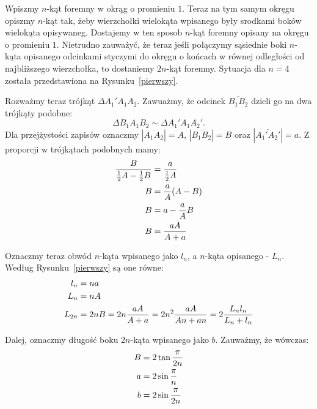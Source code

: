Wpiszmy $n$-kąt foremny w okrąg o promieniu $1$. Teraz na tym samym okręgu opiszmy $n$-kąt tak, żeby wierzchołki wielokąta wpisanego były srodkami boków wielokąta opisywaneg. Dostajemy w ten sposob $n$-kąt foremny opisany na okręgu o promieniu $1$. Nietrudno zauważyć, że teraz jeśli połączymy sąsiednie boki $n$-kąta opisanego odcinkami styczymi do okręgu o końcach w równej odległości od najbliższego wierzchołka, to dostaniemy $2n$-kąt foremny. Sytuacja dla $n=4$ została  przedstawiona na Rysunku~\ref{pierwszy}.

Rozważmy teraz trójkąt $\Delta A_1'A_1A_2$. Zawuażmy, że odcinek $\overline{B_1B_2}$ dzieli go na dwa trójkąty podobne:
$$\Delta B_1A_1B_2\sim\Delta A_1'A_1A_2'.$$
Dla przejżystości zapisów oznaczmy $|\overline{A_1A_2}|=A$, $|\overline{B_1B_2}|=B$ oraz $|\overline{A_1'A_2'}|=a$. Z proporcji w trójkątach podobnych mamy:
\begin{align*}
    {B\over \frac12A-\frac12B}&={a\over \frac 12A}\\
    B&=\frac aA(A-B)\\
    B&=a-\frac aAB\\
    B&={aA\over A+a}
\end{align*}

Oznaczmy teraz obwód $n$-kąta wpisanego jako $l_n$, a $n$-kąta opisanego - $L_n$. Według Rysunku~\ref{pierwszy} są one równe:
\begin{align*}
    l_n&=na\\
    L_n&=nA\\
    L_{2n}&=2nB=2n{aA\over A+a}=2n^2{aA\over An+an}=2{L_nl_n\over L_n+l_n}
\end{align*}

Dalej, oznaczmy długość boku $2n$-kąta wpisanego jako $b$. Zauważmy, że wówczas:
\begin{align*}
    B&=2\tan{\pi\over 2n}\\
    a&=2\sin{\pi\over n}\\
    b&=2\sin{\pi\over 2n}
\end{align*}

